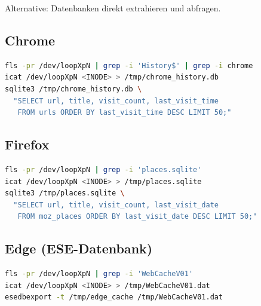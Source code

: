 Alternative: Datenbanken direkt extrahieren und abfragen.

\subsection{Chrome}

\begin{lstlisting}[language=bash]
fls -pr /dev/loopXpN | grep -i 'History$' | grep -i chrome
icat /dev/loopXpN <INODE> > /tmp/chrome_history.db
sqlite3 /tmp/chrome_history.db \
  "SELECT url, title, visit_count, last_visit_time
   FROM urls ORDER BY last_visit_time DESC LIMIT 50;"
\end{lstlisting}

\subsection{Firefox}

\begin{lstlisting}[language=bash]
fls -pr /dev/loopXpN | grep -i 'places.sqlite'
icat /dev/loopXpN <INODE> > /tmp/places.sqlite
sqlite3 /tmp/places.sqlite \
  "SELECT url, title, visit_count, last_visit_date
   FROM moz_places ORDER BY last_visit_date DESC LIMIT 50;"
\end{lstlisting}

\subsection{Edge (ESE-Datenbank)}

\begin{lstlisting}[language=bash]
fls -pr /dev/loopXpN | grep -i 'WebCacheV01'
icat /dev/loopXpN <INODE> > /tmp/WebCacheV01.dat
esedbexport -t /tmp/edge_cache /tmp/WebCacheV01.dat
\end{lstlisting}
